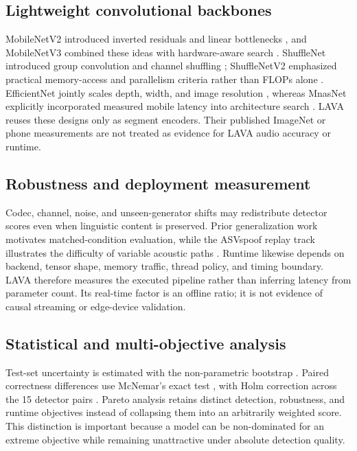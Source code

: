 \documentclass[10pt,journal]{IEEEtran}
\begin{document}
\subsection{Lightweight convolutional backbones}
MobileNetV2 introduced inverted residuals and linear bottlenecks \cite{sandler2018mobilenetv2}, and MobileNetV3 combined these ideas with hardware-aware search \cite{howard2019mobilenetv3}. ShuffleNet introduced group convolution and channel shuffling \cite{zhang2018shufflenet}; ShuffleNetV2 emphasized practical memory-access and parallelism criteria rather than FLOPs alone \cite{ma2018shufflenetv2}. EfficientNet jointly scales depth, width, and image resolution \cite{tan2019efficientnet}, whereas MnasNet explicitly incorporated measured mobile latency into architecture search \cite{tan2019mnasnet}. LAVA reuses these designs only as segment encoders. Their published ImageNet or phone measurements are not treated as evidence for LAVA audio accuracy or runtime.

\subsection{Robustness and deployment measurement}
Codec, channel, noise, and unseen-generator shifts may redistribute detector scores even when linguistic content is preserved. Prior generalization work \cite{muller2022generalize,kawa2022attack,muller2024harder,pascu2024calibrated,li2024crossdomain,das2025nonsemantic,ciobanu2026xmad} motivates matched-condition evaluation, while the ASVspoof replay track illustrates the difficulty of variable acoustic paths \cite{kinnunen2017asvspoof}. Runtime likewise depends on backend, tensor shape, memory traffic, thread policy, and timing boundary. LAVA therefore measures the executed pipeline rather than inferring latency from parameter count. Its real-time factor is an offline ratio; it is not evidence of causal streaming or edge-device validation.

\subsection{Statistical and multi-objective analysis}
Test-set uncertainty is estimated with the non-parametric bootstrap \cite{efron1979bootstrap}. Paired correctness differences use McNemar's exact test \cite{mcnemar1947}, with Holm correction across the 15 detector pairs \cite{holm1979}. Pareto analysis retains distinct detection, robustness, and runtime objectives instead of collapsing them into an arbitrarily weighted score. This distinction is important because a model can be non-dominated for an extreme objective while remaining unattractive under absolute detection quality.
\end{document}
